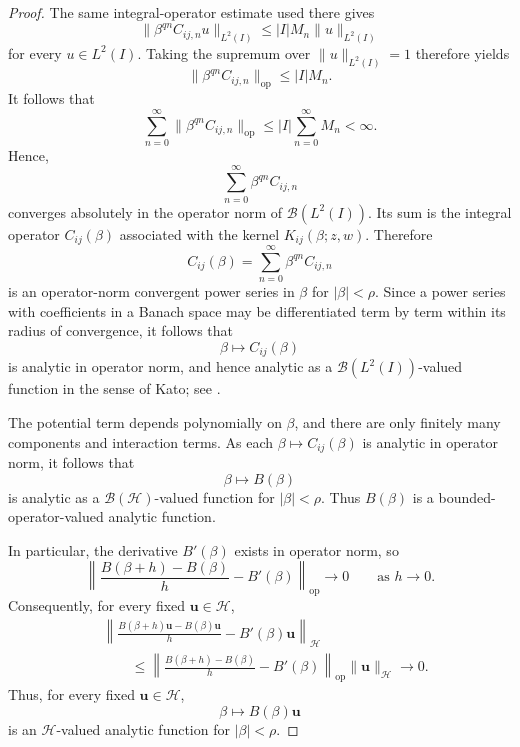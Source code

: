 \documentclass[preprint,12pt]{elsarticle}
\newcommand{\fvect}[1]{\mathbf{#1}}
\begin{document}
\begin{proof}
The same integral-operator estimate used there gives
\[
    \|\beta^{qn}C_{ij,n}u\|_{L^2(I)}
    \leq
    |I|M_n\|u\|_{L^2(I)}
\]
for every $u\in L^2(I)$. Taking the supremum over
$\|u\|_{L^2(I)}=1$ therefore yields
\[
    \|\beta^{qn}C_{ij,n}\|_{\mathrm{op}}
    \leq
    |I|M_n.
\]
It follows that
\[
    \sum_{n=0}^{\infty}
    \|\beta^{qn}C_{ij,n}\|_{\mathrm{op}}
    \leq
    |I|
    \sum_{n=0}^{\infty}M_n
    <\infty.
\]
Hence, 
\[\sum_{n=0}^{\infty}\beta^{qn}C_{ij,n}\] 
converges absolutely in the operator norm of $\mathcal B(L^2(I))$. 
Its sum is the integral operator
$C_{ij}(\beta)$ associated with the kernel
$K_{ij}(\beta;z,w)$.
Therefore
\[
    C_{ij}(\beta)
    =
    \sum_{n=0}^{\infty}
    \beta^{qn}C_{ij,n}
\]
is an operator-norm convergent power series in $\beta$ for
$|\beta|<\rho$. Since a power series with coefficients in a Banach
space may be differentiated term by term within its radius of
convergence, it follows that
\[
    \beta\longmapsto C_{ij}(\beta)
\]
is analytic in operator norm, and hence analytic as a
$\mathcal B(L^2(I))$-valued function in the sense of Kato; see
\cite[Chapter~VII, \S1.1]{Kato}.

The potential term depends polynomially on $\beta$, and there are only
finitely many components and interaction terms. As each
$\beta\mapsto C_{ij}(\beta)$ is analytic in operator norm, it follows
that
\[
    \beta\longmapsto B(\beta)
\]
is analytic as a $\mathcal B(\mathcal H)$-valued function for
$|\beta|<\rho$. Thus $B(\beta)$ is a bounded-operator-valued analytic function. 

In particular, the derivative $B'(\beta)$ exists in operator norm, so
\[
    \left\|
        \frac{B(\beta+h)-B(\beta)}{h}
        -
        B'(\beta)
    \right\|_{\mathrm{op}}
    \longrightarrow 0
    \qquad\text{as }h\to0.
\]
Consequently, for every fixed $\fvect{u}\in\mathcal H$,
\[
\begin{aligned}
    &
    \left\|
        \frac{B(\beta+h)\fvect{u}-B(\beta)\fvect{u}}{h}
        -
        B'(\beta)\fvect{u}
    \right\|_{\mathcal H}
    \\
    &\qquad\leq
    \left\|
        \frac{B(\beta+h)-B(\beta)}{h}
        -
        B'(\beta)
    \right\|_{\mathrm{op}}
    \|\fvect{u}\|_{\mathcal H}
    \longrightarrow 0.
\end{aligned}
\]
Thus, for every fixed $\fvect{u}\in\mathcal H$,
\[
    \beta\longmapsto B(\beta)\fvect{u}
\]
is an $\mathcal H$-valued analytic function for $|\beta|<\rho$.


\end{proof}
\end{document}
